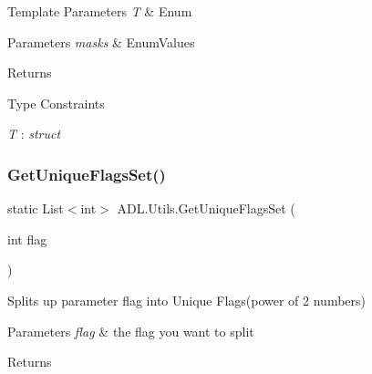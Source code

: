 \begin{DoxyTemplParams}{Template Parameters}
{\em T} & Enum\\
\hline
\end{DoxyTemplParams}

\begin{DoxyParams}{Parameters}
{\em masks} & Enum\+Values\\
\hline
\end{DoxyParams}
\begin{DoxyReturn}{Returns}

\end{DoxyReturn}
\begin{Desc}
\item[Type Constraints]\begin{description}
\item[{\em T} : {\em struct}]\end{description}
\end{Desc}
\mbox{\label{class_a_d_l_1_1_utils_afdadf33d3a7626d82a239f750d12f076}} 
\subsubsection{\texorpdfstring{Get\+Unique\+Flags\+Set()}{GetUniqueFlagsSet()}}
{\footnotesize\ttfamily static List$<$int$>$ A\+D\+L.\+Utils.\+Get\+Unique\+Flags\+Set (\begin{DoxyParamCaption}\item[{int}]{flag }\end{DoxyParamCaption})\hspace{0.3cm}{\ttfamily [static]}}



Splits up parameter flag into Unique Flags(power of 2 numbers) 


\begin{DoxyParams}{Parameters}
{\em flag} & the flag you want to split\\
\hline
\end{DoxyParams}
\begin{DoxyReturn}{Returns}

\end{DoxyReturn}
\mbox{\label{class_a_d_l_1_1_utils_ac921cfeea8d73d9ac4298802e2594504}} 
